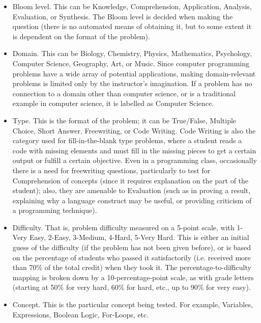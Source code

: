 \documentclass[hidelinks,11pt]{article}
\begin{document}
\begin{itemize}

  \item Bloom level.  This can be Knowledge, Comprehension, Application,
   Analysis, Evaluation, or Synthesis.  The Bloom level is decided when
   making the question (there is no automated means of obtaining it, but
   to some extent it is dependent on the format of the problem).

   \item Domain.  This can be Biology, Chemistry, Physics, Mathematics,
   Psychology, Computer Science, Geography, Art, or Music.  Since computer
   programming problems have a wide array of potential applications, making
   domain-relevant problems is limited only by the instructor's imagination.
   If a problem has no connection to a domain other than computer science, or
   is a traditional example in computer science, it is labelled as Computer
   Science.

   \item Type.  This is the format of the problem; it can be True/False,
   Multiple Choice, Short Answer, Freewriting, or Code Writing. Code Writing is
   also the category used for fill-in-the-blank type problems, where a student
   reads a code with missing elements and must fill in the missing pieces to
   get a certain output or fulfill a certain objective. Even in a programming
   class, occasionally there is a need for freewriting questions, particularly
   to test for Comprehension of concepts (since it requires explanation on the
   part of the student); also, they are amenable to Evaluation (such as in
   proving a result, explaining why a language construct may be useful, or
   providing criticism of a programming technique).

   \item Difficulty.  That is, problem difficulty measured on a 5-point scale,
   with 1-Very Easy, 2-Easy, 3-Medium, 4-Hard, 5-Very Hard. This is either an
   initial guess of the difficulty (if the problem has not been given before),
   or is based on the percentage of students who passed it satisfactorily (i.e.
   received more than 70\% of the total credit) when they took it. The
   percentage-to-difficulty mapping is broken down by a 10-percentage-point
   scale, as with grade letters (starting at 50\% for very hard, 60\% for hard,
   etc., up to 90\% for very easy). 

   \item Concept.  This is the particular concept being tested.  For example,
   Variables, Expressions, Boolean Logic, For-Loops, etc. 
   

\end{itemize}
\end{document}
